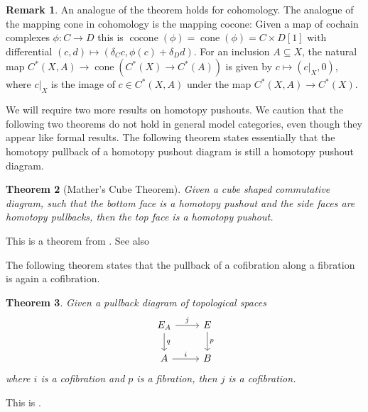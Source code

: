 \documentclass{scrartcl}
\theoremstyle{plain}
\newtheorem{theorem}{Theorem}[section]
\theoremstyle{definition}
\newtheorem{remark}[theorem]{Remark}
\newcommand{\cat}[1]{\mathbcal{#1}}
\renewcommand{\subset}{\subseteq}
\DeclareMathOperator{\cone}{cone}
\DeclareMathOperator{\cocone}{cocone}
\let\xto\xrightarrow
\let\xfrom\xleftarrow
\renewcommand{\coprod}{\mathbin{\amalg}}
\begin{document}
\begin{remark}
    An analogue of the theorem holds for cohomology. The analogue of the mapping cone in cohomology is the mapping cocone: Given a map of cochain complexes $\phi\colon C\to D$ this is $\cocone(\phi) = \cone(\phi) = C\times D[1]$ with differential $(c, d)\mapsto (\delta_C c, \phi(c) + \delta_D d)$. For an inclusion $A\subset X$, the natural map $C^*(X, A)\to\cone(C^*(X)\to C^*(A))$ is given by $c\mapsto (c|_X, 0)$, where $c|_X$ is the image of $c\in C^*(X, A)$ under the map $C^*(X, A)\to C^*(X)$.
\end{remark}

We will require two more results on homotopy pushouts. We caution that the following two theorems do not hold in general model categories, even though they appear like formal results. 
The following theorem states essentially that the homotopy pullback of a homotopy pushout diagram is still a homotopy pushout diagram. 
\begin{theorem}[Mather's Cube Theorem]\label{thm:mather-cube}
    Given a cube shaped commutative diagram, such that the bottom face is a homotopy pushout and the side faces are homotopy pullbacks, then the top face is a homotopy pushout.
\end{theorem}
This is a theorem from \cite{mather1976pull}. See also \cite{Strom2011ModernCH}

The following theorem states that the pullback of a cofibration along a fibration is again a cofibration.
\begin{theorem}
    Given a pullback diagram of topological spaces 
    \begin{equation}
        \begin{tikzcd}
            E_A \dar["q"] \rar["j"] & E \dar["p"] \\
            A \rar["i"] & B
        \end{tikzcd}
    \end{equation}
    where $i$ is a cofibration and $p$ is a fibration, then $j$ is a cofibration. 
\end{theorem}
This is \cite[14.1]{Strom2011ModernCH}.



\end{document}
